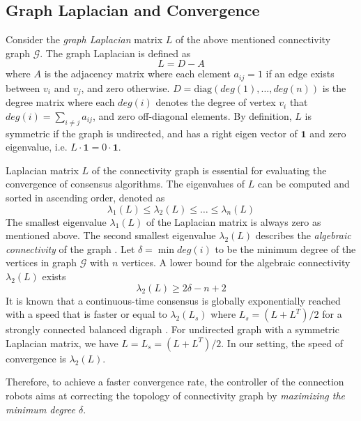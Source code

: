 \documentclass[../main.tex]{subfiles}
\begin{document}
\subsection{Graph Laplacian and Convergence} \label{sec:laplacian}
Consider the \textit{graph Laplacian} matrix $L$ of the above mentioned connectivity graph $\mathcal{G}$. The graph Laplacian is defined as 
\begin{equation}\label{eq:laplacian} 
L = D - A
\end{equation}
where $A$ is the adjacency matrix where each element $a_{ij}=1$ if an edge exists between $v_i$ and $v_j$, and zero otherwise. $D = \text{diag}(deg(1), \ldots, deg(n))$ is the degree matrix where each $deg(i)$ denotes the degree of vertex $v_i$ that $deg(i) = \sum_{i \neq j} a_{ij}$, and zero off-diagonal elements. By definition, $L$ is symmetric if the graph is undirected, and has a right eigen vector of $\mathbf{1}$ and zero eigenvalue, i.e. $L \cdot \mathbf{1} = 0 \cdot \mathbf{1}$.

Laplacian matrix $L$ of the connectivity graph is essential for evaluating the convergence of consensus algorithms. The eigenvalues of $L$ can be computed and sorted in ascending order, denoted as
\begin{equation} 
    \lambda_1(L) \leq \lambda_2(L) \leq \ldots \leq \lambda_n(L)
\end{equation}
The smallest eigenvalue $\lambda_1(L)$ of the Laplacian matrix is always zero as mentioned above. The second smallest eigenvalue $\lambda_2(L)$ describes the \textit{algebraic connectivity} of the graph \cite{fiedler1973algebraic}. Let $\delta = \min deg(i)$ to be the minimum degree of the vertices in graph $\mathcal{G}$ with $n$ vertices. A lower bound for the algebraic connectivity $\lambda_2(L)$ exists \cite{de2007old}
\begin{equation}\label{eq:lambda_bound} 
\lambda_2(L) \geq 2 \delta - n + 2
\end{equation}
It is known that a continuous-time consensus is globally exponentially reached with a speed that is faster or equal to $\lambda_2(L_s)$ where $L_s = (L + L^T)/2$ for a strongly connected balanced digraph \cite{olfati2007consensus}. For undirected graph with a symmetric Laplacian matrix, we have $L = L_s = (L + L^T)/2$. In our setting, the speed of convergence is $\lambda_2(L)$. 

Therefore, to achieve a faster convergence rate, the controller of the connection robots aims at correcting the topology of connectivity graph by  \textit{maximizing the minimum degree $\delta$}.
\end{document}
